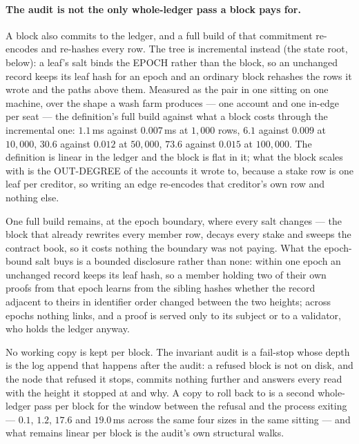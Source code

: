 \paragraph{The audit is not the only whole-ledger pass a block pays for.} A block also
commits to the ledger, and a full build of that commitment re-encodes and re-hashes
every row. The tree is incremental instead (the state root, below): a leaf's salt binds
the EPOCH rather than the block, so an unchanged record keeps its leaf hash for an epoch
and an ordinary block rehashes the rows it wrote and the paths above them. Measured as the
pair in one sitting on one machine, over the shape a wash farm produces --- one account
and one in-edge per seat --- the definition's full build against what a block costs
through the incremental one: $1.1$\,ms against $0.007$\,ms at $1{,}000$ rows, $6.1$
against $0.009$ at $10{,}000$, $30.6$ against $0.012$ at $50{,}000$, $73.6$ against
$0.015$ at $100{,}000$. The definition is linear in the ledger and the block is flat in
it; what the block scales with is the OUT-DEGREE of the accounts it wrote to, because a
stake row is one leaf per creditor, so writing an edge re-encodes that creditor's own row
and nothing else.

One full build remains, at the epoch boundary, where every salt changes --- the block
that already rewrites every member row, decays every stake and sweeps the contract book,
so it costs nothing the boundary was not paying. What the epoch-bound salt buys is a
bounded disclosure rather than none: within one epoch an unchanged record keeps its leaf
hash, so a member holding two of their own proofs from that epoch learns from the sibling
hashes whether the record adjacent to theirs in identifier order changed between the two
heights; across epochs nothing links, and a proof is served only to its subject or to a
validator, who holds the ledger anyway.

No working copy is kept per block. The invariant audit is a fail-stop whose depth is the
log append that happens after the audit: a refused block is not on disk, and the node that
refused it stops, commits nothing further and answers every read with the height it
stopped at and why. A copy to roll back to is a second whole-ledger pass per block for the
window between the refusal and the process exiting --- $0.1$, $1.2$, $17.6$ and
$19.0$\,ms across the same four sizes in the same sitting --- and what remains linear per
block is the audit's own structural walks.

